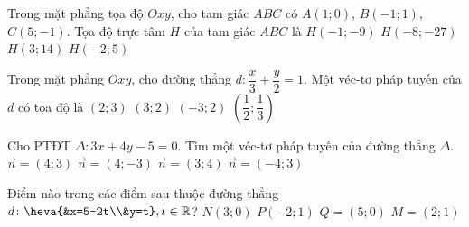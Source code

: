 \begin{ex}%
	Trong mặt phẳng tọa độ $Oxy$, cho tam giác $ABC$ có $A\left( 1;0 \right)$, $B\left( -1;1 \right)$, $C\left( 5;-1 \right)$. Tọa độ trực tâm $H$ của tam giác $ABC$ là
	\choice
	{ $H\left( -1;-9 \right)$}
	{\True $H\left( -8;-27 \right)$}
	{ $H\left( 3;14 \right)$}
	{ $H\left( -2;5 \right)$}
\end{ex}


\begin{ex}%
	Trong mặt phẳng $Oxy$, cho đường thẳng $d\colon \dfrac{x}{3}+\dfrac{y}{2}=1$. Một véc-tơ pháp tuyến của $d$ có tọa độ là
	\choice
	{\True $(2;3)$}
	{$(3;2)$}
	{ $(-3;2)$}
	{$\left(\dfrac{1}{2};\dfrac{1}{3}\right)$}
\end{ex}


\begin{ex}%
	Cho PTĐT $\Delta \colon 3x+4y-5=0$. Tìm một véc-tơ pháp tuyến của đường thẳng $\Delta$.
	\choice
	{$\overrightarrow{n}=(4;3)$}
	{$\overrightarrow{n}=(4;-3)$}
	{\True $\overrightarrow{n}=(3;4)$}
	{$\overrightarrow{n}=(-4;3)$}
\end{ex}


\begin{ex}%
	Điểm nào trong các điểm sau thuộc đường thẳng $d\colon \heva{&x=5-2t\\&y=t}, t\in \mathbb{R}$?
	\choice
	{$N(3;0) $}
	{$P(-2;1) $}
	{\True $Q=(5;0) $}
	{$M=(2;1) $}
\end{ex}


